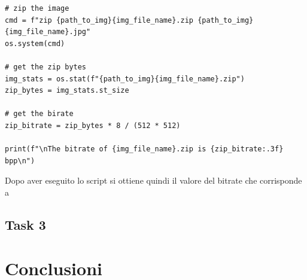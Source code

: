 \begin{lstlisting}
# zip the image
cmd = f"zip {path_to_img}{img_file_name}.zip {path_to_img}{img_file_name}.jpg"
os.system(cmd)

# get the zip bytes
img_stats = os.stat(f"{path_to_img}{img_file_name}.zip")
zip_bytes = img_stats.st_size

# get the birate
zip_bitrate = zip_bytes * 8 / (512 * 512) 

print(f"\nThe bitrate of {img_file_name}.zip is {zip_bitrate:.3f} bpp\n")
\end{lstlisting}

\noindent Dopo aver eseguito lo script si ottiene quindi il valore del bitrate che corrisponde a 





\subsection*{Task 3}

\section{Conclusioni}


